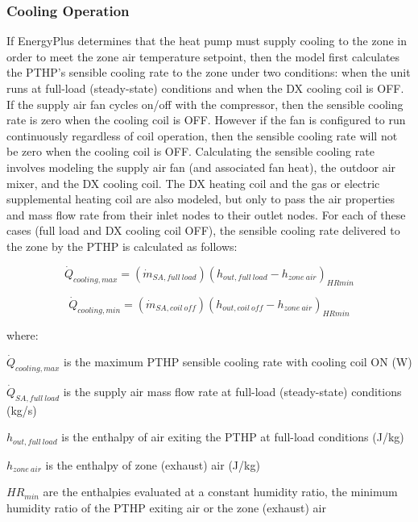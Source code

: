 \subsubsection{Cooling Operation}\label{cooling-operation-1-000}

If EnergyPlus determines that the heat pump must supply cooling to the zone in order to meet the zone air temperature setpoint, then the model first calculates the PTHP's sensible cooling rate to the zone under two conditions: when the unit runs at full-load (steady-state) conditions and when the DX cooling coil is OFF. If the supply air fan cycles on/off with the compressor, then the sensible cooling rate is zero when the cooling coil is OFF. However if the fan is configured to run continuously regardless of coil operation, then the sensible cooling rate will not be zero when the cooling coil is OFF. Calculating the sensible cooling rate involves modeling the supply air fan (and associated fan heat), the outdoor air mixer, and the DX cooling coil. The DX heating coil and the gas or electric supplemental heating coil are also modeled, but only to pass the air properties and mass flow rate from their inlet nodes to their outlet nodes. For each of these cases (full load and DX cooling coil OFF), the sensible cooling rate delivered to the zone by the PTHP is calculated as follows:

\begin{equation}
  \dot{Q}_{cooling,max} = \left( \dot{m}_{SA,full~load} \right) \left( h_{out,full~load} - h_{zone~air} \right)_{HRmin}
\end{equation}

\begin{equation}
  \dot{Q}_{cooling,min} = \left( \dot{m}_{SA,coil~off} \right) \left( h_{out,coil~off} - h_{zone~air} \right)_{HRmin}
\end{equation}

where:

\(\dot{Q}_{cooling,max}\) is the maximum PTHP sensible cooling rate with cooling coil ON (W)

\(\dot{Q}_{SA,full~load}\) is the supply air mass flow rate at full-load (steady-state) conditions (kg/s)

\(h_{out,full~load}\) is the enthalpy of air exiting the PTHP at full-load conditions (J/kg)

\(h_{zone~air}\) is the enthalpy of zone (exhaust) air (J/kg)

\(HR_{min}\) are the enthalpies evaluated at a constant humidity ratio, the minimum humidity ratio of the PTHP exiting air or the zone (exhaust) air

